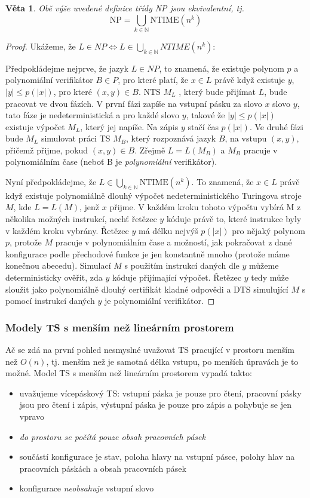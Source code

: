 \documentclass[11pt]{report} %
\newcommand{\N}{\mathbb{N}}
\newtheorem{theorem}{Věta}[section]
\begin{document}
\begin{theorem}
Obě výše uvedené definice třídy NP jsou ekvivalentní, tj.
$$\text{NP} = \bigcup_{k\in\N}\text{NTIME}(n^k) $$
\end{theorem}
\begin{proof}
	Ukážeme, že $L \in NP \Leftrightarrow L \in \bigcup_{k\in\N}NTIME(n^k)$:
	
	\uv{$\Rightarrow$} Předpokládejme nejprve, že jazyk $L \in NP$, to znamená, že existuje polynom $p$ a polynomiální verifikátor $B \in P$, pro které platí, že $x \in L$ právě když existuje $y$, $|y| \leq p(|x|)$, pro které $(x, y) \in B$. NTS $M_L$ , který bude přijímat $L$, bude pracovat ve dvou fázích. V první fázi zapíše na vstupní pásku za slovo $x$ slovo $y$, tato fáze je nedeterministická a pro každé slovo $y$, takové že $|y| \leq p(|x|)$ existuje výpočet $M_L$, který jej napíše. Na zápis $y$ stačí čas $p(|x|)$. Ve druhé fázi bude $M_L$ simulovat práci TS $M_B$, který rozpoznává jazyk $B$, na vstupu $(x, y)$, přičemž přijme, pokud $(x, y) \in B$. Zřejmě $L = L(M_B)$ a $M_B$ pracuje v polynomiálním čase (neboť B je \textit{polynomiální} verifikátor).
	
	\uv{$\Leftarrow$} Nyní předpokládejme, že $L \in \bigcup_{k\in\N}\text{NTIME}(n^k)$. To znamená, že $x \in L$ právě když existuje polynomiálně dlouhý výpočet nedeterministického Turingova stroje $M$, kde $L = L(M)$, jenž $x$ přijme. V každém kroku tohoto výpočtu vybírá M z několika možných instrukcí, nechť řetězec $y$ kóduje právě to, které instrukce byly v každém kroku vybrány. Řetězec $y$ má délku nejvýš $p(|x|)$ pro nějaký polynom $p$, protože $M$ pracuje v polynomiálním čase a možností, jak pokračovat z dané konfigurace podle přechodové funkce je jen konstantně mnoho (protože máme konečnou abecedu). Simulací $M$ s použitím instrukcí daných dle $y$ můžeme deterministicky ověřit, zda $y$ kóduje přijímající výpočet. Řetězec $y$ tedy může sloužit jako polynomiálně dlouhý certifikát kladné odpovědi a DTS simulující $M$ s pomocí instrukcí daných $y$ je polynomiální verifikátor.
\end{proof}

\subsubsection{Modely TS s menším než lineárním prostorem}
Ač se zdá na první pohled nesmyslné uvažovat TS pracující v prostoru menším než $O(n)$, tj. menším než je samotná délka vstupu, po menších úpravách je to možné. Model TS s menším než lineárním prostorem vypadá takto: 
\begin{itemize}
	\leftskip 20pt
	\setlength{\itemsep}{0pt}
	\item uvažujeme vícepáskový TS: vstupní páska je pouze pro čtení, pracovní pásky jsou pro čtení i zápis, výstupní páska je pouze pro zápis a pohybuje se jen vpravo
	\item \textit{do prostoru se počítá pouze obsah pracovních pásek}
	\item součástí konfigurace je stav, poloha hlavy na vstupní pásce, polohy hlav na pracovních páskách a obsah pracovních pásek
	\item konfigurace \textit{neobsahuje} vstupní slovo
\end{itemize}
\end{document}
